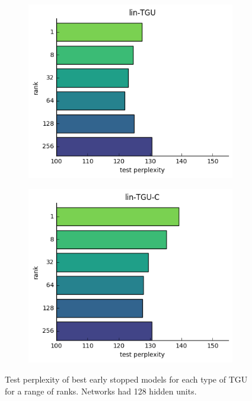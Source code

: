 \begin{figure}[ht]
\begin{subfigure}[t]{0.45\textwidth}
	\includegraphics[width=\textwidth]{exps/ptb/lintgu-rank}
\end{subfigure}\hfill
\begin{subfigure}[t]{0.45\textwidth}
	\includegraphics[width=\textwidth]{exps/ptb/lintguc-rank}
\end{subfigure}

\caption[TGU PTB results by rank]{Test perplexity
 of best early stopped models for
each type of TGU for a range of ranks. Networks had 128 hidden units.}
\label{fig:ptbtgurank}
\end{figure}


